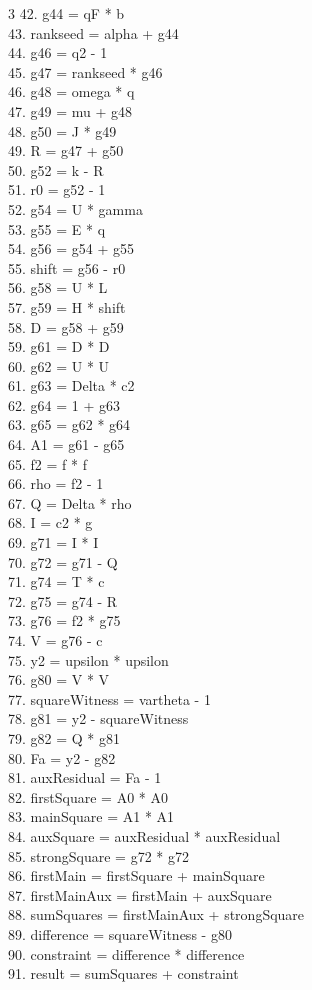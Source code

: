 \documentclass[10pt]{article}
\begin{document}
\begin{multicols}{3}
42. g44 = qF * b\\
43. rankseed = alpha + g44\\
44. g46 = q2 - 1\\
45. g47 = rankseed * g46\\
46. g48 = omega * q\\
47. g49 = mu + g48\\
48. g50 = J * g49\\
49. R = g47 + g50\\
50. g52 = k - R\\
51. r0 = g52 - 1\\
52. g54 = U * gamma\\
53. g55 = E * q\\
54. g56 = g54 + g55\\
55. shift = g56 - r0\\
56. g58 = U * L\\
57. g59 = H * shift\\
58. D = g58 + g59\\
59. g61 = D * D\\
60. g62 = U * U\\
61. g63 = Delta * c2\\
62. g64 = 1 + g63\\
63. g65 = g62 * g64\\
64. A1 = g61 - g65\\
65. f2 = f * f\\
66. rho = f2 - 1\\
67. Q = Delta * rho\\
68. I = c2 * g\\
69. g71 = I * I\\
70. g72 = g71 - Q\\
71. g74 = T * c\\
72. g75 = g74 - R\\
73. g76 = f2 * g75\\
74. V = g76 - c\\
75. y2 = upsilon * upsilon\\
76. g80 = V * V\\
77. squareWitness = vartheta - 1\\
78. g81 = y2 - squareWitness\\
79. g82 = Q * g81\\
80. Fa = y2 - g82\\
81. auxResidual = Fa - 1\\
82. firstSquare = A0 * A0\\
83. mainSquare = A1 * A1\\
84. auxSquare = auxResidual * auxResidual\\
85. strongSquare = g72 * g72\\
86. firstMain = firstSquare + mainSquare\\
87. firstMainAux = firstMain + auxSquare\\
88. sumSquares = firstMainAux + strongSquare\\
89. difference = squareWitness - g80\\
90. constraint = difference * difference\\
91. result = sumSquares + constraint\\
\end{multicols}
\end{document}
